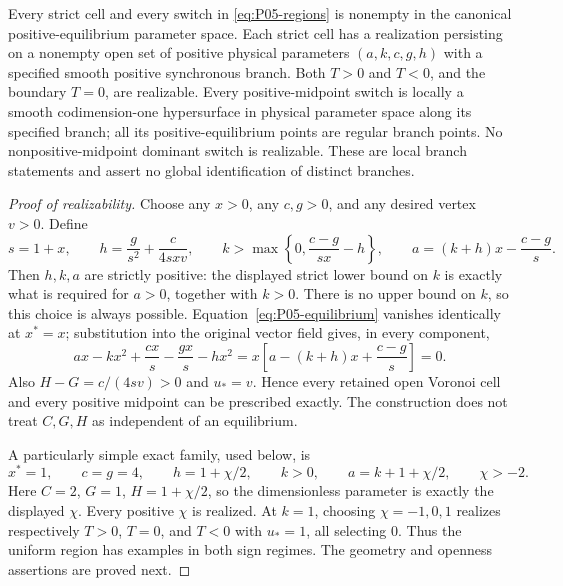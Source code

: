 \begin{theorem}
\label{thm:P05-realization}
Every strict cell and every switch in \eqref{eq:P05-regions} is nonempty
in the canonical positive-equilibrium parameter space. Each strict cell
has a realization persisting on a nonempty open set of positive physical
parameters $(a,k,c,g,h)$ with a specified smooth positive synchronous
branch. Both $T>0$ and $T<0$, and the boundary $T=0$, are realizable.
Every positive-midpoint switch is locally a smooth codimension-one
hypersurface in physical parameter space along its specified branch;
all its positive-equilibrium points are regular branch points. No
nonpositive-midpoint dominant switch is realizable. These are local
branch statements and assert no global identification of distinct branches.
\end{theorem}
\begin{proof}[Proof of realizability]
Choose any $x>0$, any $c,g>0$, and any desired vertex $v>0$. Define
\begin{equation}
 s=1+x,\qquad h=\frac{g}{s^2}+\frac{c}{4sxv},\qquad
 k>\max\left\{0,\frac{c-g}{sx}-h\right\},\qquad
 a=(k+h)x-\frac{c-g}{s}.
 \label{eq:P05-construction}
\end{equation}
Then $h,k,a$ are strictly positive: the displayed strict lower bound on
$k$ is exactly what is required for $a>0$, together with $k>0$.
There is no upper bound on $k$, so this choice is always possible.
Equation~\eqref{eq:P05-equilibrium} vanishes identically at $x^*=x$;
substitution into the original vector field gives, in every component,
\[
 ax-kx^2+\frac{cx}{s}-\frac{gx}{s}-hx^2
 =x\left[a-(k+h)x+\frac{c-g}{s}\right]=0.
\]
Also $H-G=c/(4sv)>0$ and $u_*=v$. Hence every retained open
Voronoi cell and every positive midpoint can be prescribed exactly.
The construction does not treat $C,G,H$ as independent of an equilibrium.

A particularly simple exact family, used below, is
\begin{equation}
 x^*=1,\qquad c=g=4,\qquad h=1+\chi/2,\qquad
 k>0,\qquad a=k+1+\chi/2,\qquad \chi>-2.
 \label{eq:P05-simple-family}
\end{equation}
Here $C=2$, $G=1$, $H=1+\chi/2$, so the dimensionless parameter
is exactly the displayed $\chi$. Every positive $\chi$ is realized.
At $k=1$, choosing $\chi=-1,0,1$ realizes respectively $T>0$,
$T=0$, and $T<0$ with $u_*=1$, all selecting $0$.
Thus the uniform region has examples in both sign regimes.
The geometry and openness assertions are proved next.
\end{proof}

